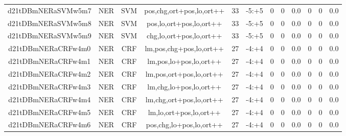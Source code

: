 \documentclass[a4paper]{article}
\begin{document}
\begin{landscape}
\begin{center}
\begin{tabular}{ |c|c|c|c|c|c|c|c|c|c|c|c|}
 
 	
 	\small{ d21tDBmNERaSVMw5m7 } & \small{ NER} & \small{  SVM }  & pos,chg,ort+pos,lo,ort++  &  33 &  \small{  -5:+5 }  &  0 & 0 & 0.0  &  0 & 0 & 0.0 \\
 	

 
 	
 	\small{ d21tDBmNERaSVMw5m8 } & \small{ NER} & \small{  SVM }  & pos,lo,ort+pos,lo,ort++  &  33 &  \small{  -5:+5 }  &  0 & 0 & 0.0  &  0 & 0 & 0.0 \\
 	

 
 	
 	\small{ d21tDBmNERaSVMw5m9 } & \small{ NER} & \small{  SVM }  & chg,lo,ort+pos,lo,ort++  &  33 &  \small{  -5:+5 }  &  0 & 0 & 0.0  &  0 & 0 & 0.0 \\
 	

 
 	
 	\small{ d21tDBmNERaCRFw4m0 } & \small{ NER} & \small{  CRF }  & lm,pos,chg+pos,lo,ort++  &  27 &  \small{  -4:+4 }  &  0 & 0 & 0.0  &  0 & 0 & 0.0 \\
 	

 
 	
 	\small{ d21tDBmNERaCRFw4m1 } & \small{ NER} & \small{  CRF }  & lm,pos,lo+pos,lo,ort++  &  27 &  \small{  -4:+4 }  &  0 & 0 & 0.0  &  0 & 0 & 0.0 \\
 	

 
 	
 	\small{ d21tDBmNERaCRFw4m2 } & \small{ NER} & \small{  CRF }  & lm,pos,ort+pos,lo,ort++  &  27 &  \small{  -4:+4 }  &  0 & 0 & 0.0  &  0 & 0 & 0.0 \\
 	

 
 	
 	\small{ d21tDBmNERaCRFw4m3 } & \small{ NER} & \small{  CRF }  & lm,chg,lo+pos,lo,ort++  &  27 &  \small{  -4:+4 }  &  0 & 0 & 0.0  &  0 & 0 & 0.0 \\
 	

 
 	
 	\small{ d21tDBmNERaCRFw4m4 } & \small{ NER} & \small{  CRF }  & lm,chg,ort+pos,lo,ort++  &  27 &  \small{  -4:+4 }  &  0 & 0 & 0.0  &  0 & 0 & 0.0 \\
 	

 
 	
 	\small{ d21tDBmNERaCRFw4m5 } & \small{ NER} & \small{  CRF }  & lm,lo,ort+pos,lo,ort++  &  27 &  \small{  -4:+4 }  &  0 & 0 & 0.0  &  0 & 0 & 0.0 \\
 	

 
 	
 	\small{ d21tDBmNERaCRFw4m6 } & \small{ NER} & \small{  CRF }  & pos,chg,lo+pos,lo,ort++  &  27 &  \small{  -4:+4 }  &  0 & 0 & 0.0  &  0 & 0 & 0.0 \\
 	


\end{tabular}
\end{center}
\end{landscape}
\end{document}
